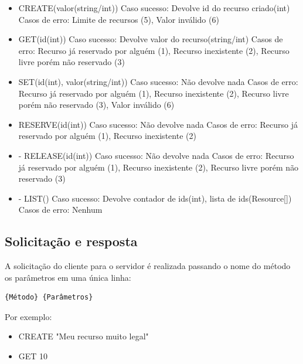 \documentclass{article}
\begin{document}
\begin{itemize}
	\item CREATE(valor(string/int))
	      \subitem Caso sucesso: Devolve id do recurso criado(int)
	      \subitem Casos de erro: Limite de recursos (5), Valor inválido (6)

	\item GET(id(int))
	      \subitem Caso sucesso: Devolve valor do recurso(string/int)
	      \subitem Casos de erro: Recurso já reservado por alguém (1), Recurso inexistente (2), Recurso livre porém não reservado (3)

	\item SET(id(int), valor(string/int))
	      \subitem Caso sucesso: Não devolve nada
	      \subitem Casos de erro: Recurso já reservado por alguém (1), Recurso inexistente (2), Recurso livre porém não reservado (3), Valor inválido (6)

	\item RESERVE(id(int))
	      \subitem Caso sucesso: Não devolve nada
	      \subitem Casos de erro: Recurso já reservado por alguém (1), Recurso inexistente (2)

	\item - RELEASE(id(int))
	      \subitem Caso sucesso: Não devolve nada
	      \subitem Casos de erro: Recurso já reservado por alguém (1), Recurso inexistente (2), Recurso livre porém não reservado (3)

	\item - LIST()
	      \subitem Caso sucesso: Devolve contador de ids(int), lista de ids(Resource[])
	      \subitem Casos de erro: Nenhum
\end{itemize}

\subsection{Solicitação e resposta}

A solicitação do cliente para o servidor é realizada passando o nome do método os parâmetros em uma única linha:

\begin{Verbatim}[tabsize=4]
	{Método} {Parâmetros}
\end{Verbatim}

Por exemplo:

\begin{itemize}
	\item CREATE "Meu recurso muito legal"
	\item GET 10
\end{itemize}
\end{document}
